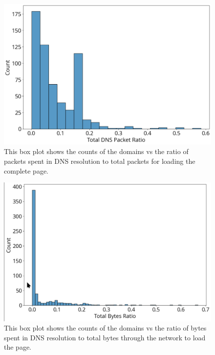 \documentclass[conference]{IEEEtran}
\begin{document}
\begin{figure}[htbp]
    \centering
    \includegraphics[width=1\linewidth]{images/packet-ratio.png}
    \caption{This box plot shows the counts of the domains vs the ratio of packets spent in DNS resolution to total packets for loading the complete page.}
    \label{fig:packet-ratio}
\end{figure}

\begin{figure}[htbp]
    \centering
    \includegraphics[width=1\linewidth]{images/bytes-ratio.png}
    \caption{This box plot shows the counts of the domains vs the ratio of bytes spent in DNS resolution to total bytes through the network to load the page.}
    \label{fig:bytes-ratio}
\end{figure}
\end{document}
